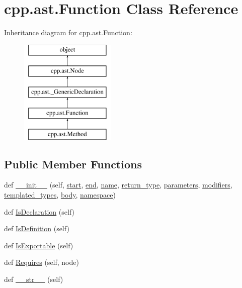 \hypertarget{classcpp_1_1ast_1_1Function}{}\section{cpp.\+ast.\+Function Class Reference}
\label{classcpp_1_1ast_1_1Function}
Inheritance diagram for cpp.\+ast.\+Function\+:\begin{figure}[H]
\begin{center}
\leavevmode
\includegraphics[height=5.000000cm]{classcpp_1_1ast_1_1Function}
\end{center}
\end{figure}
\subsection*{Public Member Functions}
\begin{DoxyCompactItemize}
\item 
def \mbox{\hyperlink{classcpp_1_1ast_1_1Function_ab5270f5d353ec5e9dcd136e4cc6c7f6c}{\+\_\+\+\_\+init\+\_\+\+\_\+}} (self, \mbox{\hyperlink{classcpp_1_1ast_1_1Node_a7b2aa97e6a049bb1a93aea48c48f1f44}{start}}, \mbox{\hyperlink{classcpp_1_1ast_1_1Node_a3c5e5246ccf619df28eca02e29d69647}{end}}, \mbox{\hyperlink{classcpp_1_1ast_1_1__GenericDeclaration_af774f4729dfd78d0538a6782fe8514c1}{name}}, \mbox{\hyperlink{classcpp_1_1ast_1_1Function_af750fd788d7ab33163ee066534780212}{return\+\_\+type}}, \mbox{\hyperlink{classcpp_1_1ast_1_1Function_a0e61ef47af9cf2fd4402dbd8cab631ef}{parameters}}, \mbox{\hyperlink{classcpp_1_1ast_1_1Function_ad30eed435f1ff9ff34ade9cc0d7be121}{modifiers}}, \mbox{\hyperlink{classcpp_1_1ast_1_1Function_a57bb03218bade3240137a0d91c467cb6}{templated\+\_\+types}}, \mbox{\hyperlink{classcpp_1_1ast_1_1Function_a8e25e5016b23b38e32acf2df529c0650}{body}}, \mbox{\hyperlink{classcpp_1_1ast_1_1__GenericDeclaration_a8aee3f11b37449d54b42a78e0a689f46}{namespace}})
\item 
def \mbox{\hyperlink{classcpp_1_1ast_1_1Function_ab9120d9a774eb5860d220b3bcdcaa87e}{Is\+Declaration}} (self)
\item 
def \mbox{\hyperlink{classcpp_1_1ast_1_1Function_ad5d96144bd8418ac72332bffb21ea86f}{Is\+Definition}} (self)
\item 
def \mbox{\hyperlink{classcpp_1_1ast_1_1Function_a85a073cd69116bc6191f379d69d10d72}{Is\+Exportable}} (self)
\item 
def \mbox{\hyperlink{classcpp_1_1ast_1_1Function_a999e7b5e43517cd4d68b1aeea8a7d6e1}{Requires}} (self, node)
\item 
def \mbox{\hyperlink{classcpp_1_1ast_1_1Function_aaef91d6a3b1eb2703eebb32d39c45978}{\+\_\+\+\_\+str\+\_\+\+\_\+}} (self)
\end{DoxyCompactItemize}
